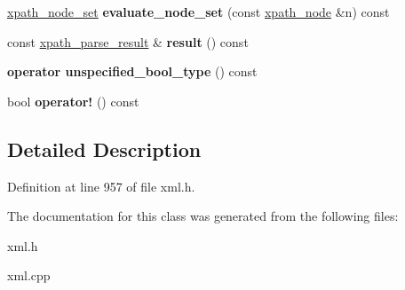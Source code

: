 \begin{DoxyCompactItemize}
\item 
\hypertarget{classphys_1_1xml_1_1xpath__query_a885b83b3082e88c477934e72b19a65ae}{
\hyperlink{classphys_1_1xml_1_1xpath__node__set}{xpath\_\-node\_\-set} {\bfseries evaluate\_\-node\_\-set} (const \hyperlink{classphys_1_1xml_1_1xpath__node}{xpath\_\-node} \&n) const }
\label{de/d9e/classphys_1_1xml_1_1xpath__query_a885b83b3082e88c477934e72b19a65ae}

\item 
\hypertarget{classphys_1_1xml_1_1xpath__query_a1b57c9d69fff49b94b03ad33132d8531}{
const \hyperlink{structphys_1_1xml_1_1xpath__parse__result}{xpath\_\-parse\_\-result} \& {\bfseries result} () const }
\label{de/d9e/classphys_1_1xml_1_1xpath__query_a1b57c9d69fff49b94b03ad33132d8531}

\item 
\hypertarget{classphys_1_1xml_1_1xpath__query_a97998963246521002d11ba405f8e6b32}{
{\bfseries operator unspecified\_\-bool\_\-type} () const }
\label{de/d9e/classphys_1_1xml_1_1xpath__query_a97998963246521002d11ba405f8e6b32}

\item 
\hypertarget{classphys_1_1xml_1_1xpath__query_ae06c5426b9e32143b1881cf12af50390}{
bool {\bfseries operator!} () const }
\label{de/d9e/classphys_1_1xml_1_1xpath__query_ae06c5426b9e32143b1881cf12af50390}

\end{DoxyCompactItemize}


\subsection{Detailed Description}


Definition at line 957 of file xml.h.



The documentation for this class was generated from the following files:\begin{DoxyCompactItemize}
\item 
xml.h\item 
xml.cpp\end{DoxyCompactItemize}
